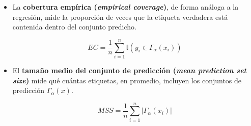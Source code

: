 \begin{itemize}
    
    



    \item La \textbf{cobertura empírica (\textit{empirical coverage})}, de forma análoga a la regresión, mide la proporción de veces que la etiqueta verdadera está contenida dentro del conjunto predicho.

    $$
    EC = \frac{1}{n} \sum_{i=1}^{n} \mathbb{I}(y_i \in \Gamma_\alpha(x_i))
    $$

    \item El \textbf{tamaño medio del conjunto de predicción (\textit{mean prediction set size})} mide qué cuántas etiquetas, en promedio, incluyen los conjuntos de predicción $\Gamma_\alpha(x)$.

    $$
    MSS = \frac{1}{n} \sum_{i=1}^n | \Gamma_\alpha(x_i) |
    $$

\end{itemize}


